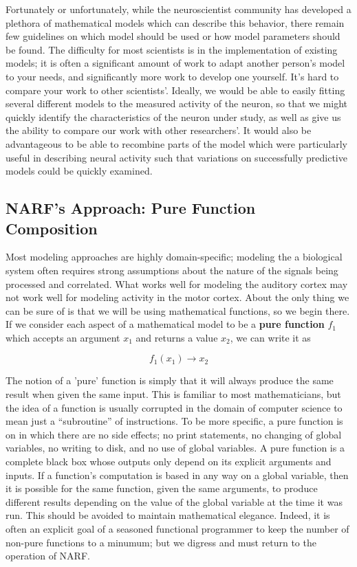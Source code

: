 \documentclass[letterpaper]{report}
\newcommand{\definition}[1]{\textbf{#1}}
\begin{document}
Fortunately or unfortunately, while the neuroscientist community has developed a plethora of mathematical models which can describe this behavior, there remain few guidelines on which model should be used or how model parameters should be found. The difficulty for most scientists is in the implementation of existing models; it is often a significant amount of work to adapt another person's model to your needs, and significantly more work to develop one yourself. It's hard to compare your work to other scientists'. Ideally, we would be able to easily fitting several different models to the measured activity of the neuron, so that we might quickly identify the characteristics of the neuron under study, as well as give us the ability to compare our work with other researchers'. It would also be advantageous to be able to recombine parts of the model which were particularly useful in describing neural activity such that variations on successfully predictive models could be quickly examined. 

\subsection{NARF's Approach: Pure Function Composition}

Most modeling approaches are highly domain-specific; modeling the a biological system often requires strong assumptions about the nature of the signals being processed and correlated. What works well for modeling the auditory cortex may not work well for modeling activity in the motor cortex. About the only thing we can be sure of is that we will be using mathematical functions, so we begin there. If we consider each aspect of a mathematical model to be a \definition{pure function} $f_1$ which accepts an argument $x_1$ and returns a value $x_2$, we can write it as

\begin{equation}
  f_1(x_1) \rightarrow x_2
\end{equation}

The notion of a 'pure' function is simply that it will always produce the same result when given the same input. This is familiar to most mathematicians, but the idea of a function is usually corrupted in the domain of computer science to mean just a ``subroutine'' of instructions. To be more specific, a pure function is on in which there are no side effects; no print statements, no changing of global variables, no writing to disk, and no use of global variables. A pure function is a complete black box whose outputs only depend on its explicit arguments and inputs. If a function's computation is based in any way on a global variable, then it is possible for the same function, given the same arguments, to produce different results depending on the value of the global variable at the time it was run. This should be avoided to maintain mathematical elegance. Indeed, it is often an explicit goal of a seasoned functional programmer to keep the number of non-pure functions to a minumum; but we digress and must return to the operation of NARF. 
\end{document}
